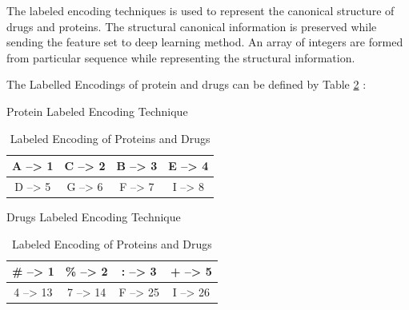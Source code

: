   The labeled encoding techniques is used to represent the canonical structure of drugs and proteins. The structural canonical information is preserved while sending the feature set to deep learning method. An array of integers are formed from particular sequence while representing the structural information.
  
  The Labelled Encodings of protein and drugs can be defined by Table \ref{table:label_encoding} :
  \begin{table}[h]
    \centering
    \begin{subtable}{Protein Labeled Encoding Technique}
      \centering
      \begin{tabular}{|cccc|}
        \hline
        A --> 1 & C --> 2 & B --> 3 & E --> 4 \\ \hline
        D --> 5 & G --> 6 & F --> 7 & I --> 8 \\ \hline
      \end{tabular}
    \end{subtable}  

    \begin{subtable}{Drugs Labeled Encoding Technique}
      \centering
      \begin{tabular}{|cccc|}
        \hline
        \# --> 1 & \% --> 2 & : --> 3 & + --> 5 \\ \hline
        4 --> 13 & 7 --> 14 & F --> 25 & I --> 26 \\ \hline
      \end{tabular}
    \end{subtable}
    \caption{Labeled Encoding of Proteins and Drugs}
    \label{table:label_encoding}
  \end{table}
  

  